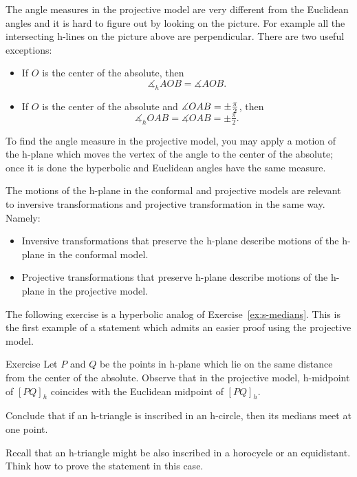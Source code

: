 The angle measures in the projective model are very different from the Euclidean angles and it is hard to figure out by looking on the picture.\label{klein-angles}
For example all the intersecting h-lines on the picture above %
are perpendicular.
There are two useful exceptions:

\begin{itemize}
\item If $O$ is the center of the absolute, then 
$$\measuredangle_hAOB=\measuredangle AOB.$$
\item If $O$ is the center of the absolute 
and 
$\measuredangle OAB\z=\pm\tfrac\pi2$, then 
$$\measuredangle_h OAB=\measuredangle OAB=\pm\tfrac\pi2.$$
\end{itemize}

To find the angle measure in the projective model,
you may apply a motion of the h-plane which moves 
the vertex of the angle to the center of the absolute;
once it is done the hyperbolic and Euclidean angles have the same measure.

The motions of the h-plane in the conformal and projective models are relevant to inversive transformations and projective transformation in the same way.
Namely: 
\begin{itemize}
\item Inversive transformations that preserve the h-plane describe motions of the h-plane in the conformal model.
\item Projective transformations that preserve h-plane describe motions of the h-plane in the projective model.
\end{itemize}

The following exercise is a hyperbolic analog of Exercise~\ref{ex:s-medians}. 
This is the first example of a statement which admits an easier proof using  the projective model.

\begin{thm}{Exercise}\label{ex:h-median}
Let $P$ and $Q$ be the points in h-plane which lie on the same distance from the center of the absolute.
Observe that in the projective model, h-midpoint of $[PQ]_h$ coincides with the Euclidean midpoint of $[PQ]_h$.

Conclude that if an h-triangle is inscribed in an h-circle, then its medians meet at one point.

Recall that an h-triangle might be also inscribed in a horocycle or an equidistant.
Think how to prove the statement in this case.
\end{thm}


